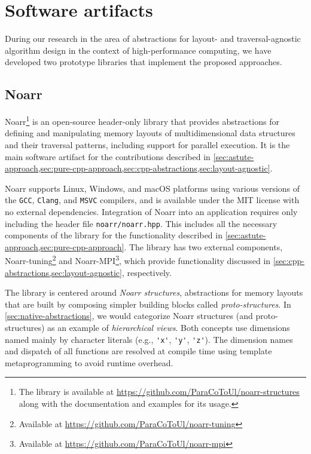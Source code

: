 \chapter{Software artifacts}\label{chap:software}

During our research in the area of abstractions for layout- and traversal-agnostic algorithm design in the context of high-performance computing, we have developed two prototype libraries that implement the proposed approaches.


\section{Noarr}\label{sec:sw-noarr}

Noarr\footnote{The library is available at \url{https://github.com/ParaCoToUl/noarr-structures} along with the documentation and examples for its usage.} is an open-source \cpptwenty header-only library that provides abstractions for defining and manipulating memory layouts of multidimensional data structures and their traversal patterns, including support for parallel execution. It is the main software artifact for the contributions described in \cref{sec:astute-approach,sec:pure-cpp-approach,sec:cpp-abstractions,sec:layout-agnostic}.

Noarr supports Linux, Windows, and macOS platforms using various versions of the \texttt{GCC}, \texttt{Clang}, and \texttt{MSVC} compilers, and is available under the MIT license with no external dependencies. Integration of Noarr into an application requires only including the header file \texttt{noarr/noarr.hpp}. This includes all the necessary components of the library for the functionality described in \cref{sec:astute-approach,sec:pure-cpp-approach}. The library has two external components, Noarr-tuning\footnote{Available at \url{https://github.com/ParaCoToUl/noarr-tuning}} and Noarr-MPI\footnote{Available at \url{https://github.com/ParaCoToUl/noarr-mpi}}, which provide functionality discussed in \cref{sec:cpp-abstractions,sec:layout-agnostic}, respectively.

The library is centered around \emph{Noarr structures}, abstractions for memory layouts that are built by composing simpler building blocks called \emph{proto-structures}. In \cref{sec:native-abstractions}, we would categorize Noarr structures (and proto-structures) as an example of \emph{hierarchical views}. Both concepts use dimensions named mainly by character literals (e.g., \lstinline{'x'}, \lstinline{'y'}, \lstinline{'z'}). The dimension names and dispatch of all functions are resolved at compile time using template metaprogramming to avoid runtime overhead.


